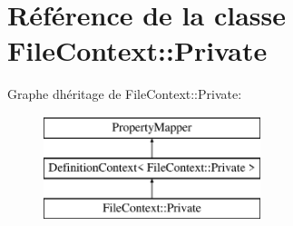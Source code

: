 \hypertarget{class_file_context_1_1_private}{}\section{Référence de la classe File\+Context\+:\+:Private}
\label{class_file_context_1_1_private}
Graphe d\textquotesingle{}héritage de File\+Context\+:\+:Private\+:\begin{figure}[H]
\begin{center}
\leavevmode
\includegraphics[height=3.000000cm]{class_file_context_1_1_private}
\end{center}
\end{figure}
